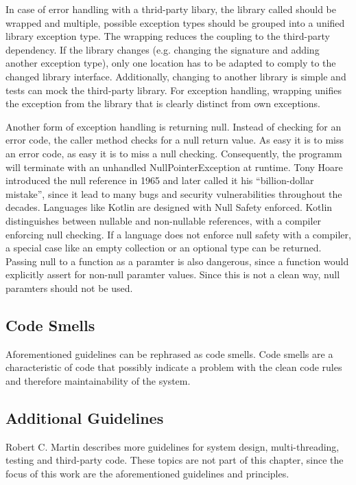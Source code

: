 In case of error handling with a thrid-party libary, the library called should be wrapped and multiple, possible exception types should be grouped into a unified library exception type. The wrapping reduces the coupling to the third-party dependency. If the library changes (e.g. changing the signature and adding another exception type), only one location has to be adapted to comply to the changed library interface. Additionally, changing to another library is simple and tests can mock the third-party library. For exception handling, wrapping unifies the exception from the library that is clearly distinct from own exceptions.

Another form of exception handling is returning null. Instead of checking for an error code, the caller method checks for a null return value. As easy it is to miss an error code, as easy it is to miss a null checking. Consequently, the programm will terminate with an unhandled NullPointerException at runtime. Tony Hoare introduced the null reference in 1965 and later called it his \enquote{billion-dollar mistake}\cite{hoare_null_2009}, since it lead to many bugs and security vulnerabilities throughout the decades. Languages like Kotlin are designed with Null Safety enforced. Kotlin distinguishes between nullable and non-nullable references, with a compiler enforcing null checking\cite{noauthor_null_nodate}. If a language does not enforce null safety with a compiler, a special case like an empty collection or an optional type can be returned. Passing null to a function as a paramter is also dangerous, since a function would explicitly assert for non-null paramter values. Since this is not a clean way, null paramters should not be used.

\subsection{Code Smells}
Aforementioned guidelines can be rephrased as code smells. Code smells are a characteristic of code that possibly indicate a problem with the clean code rules and therefore maintainability of the system.

\subsection{Additional Guidelines}
Robert C. Martin describes more guidelines for system design, multi-threading, testing and third-party code\cite{martin_clean_2009}. These topics are not part of this chapter, since the focus of this work are the aforementioned guidelines and principles. 



